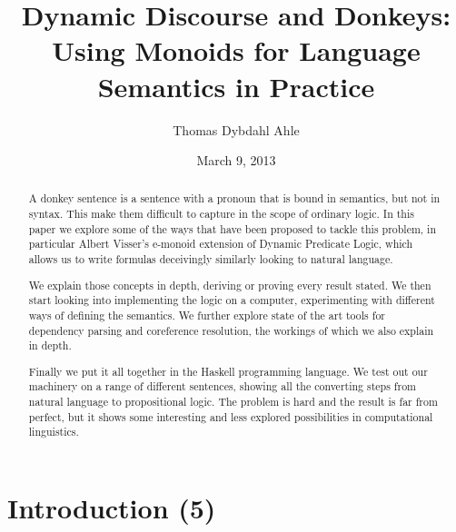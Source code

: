 \documentclass[12pt]{article}
\title{Dynamic Discourse and Donkeys: Using Monoids for Language Semantics in Practice}
\author{Thomas Dybdahl Ahle}
\date{March 9, 2013}
\let\stdsection\section
\renewcommand\section{\newpage\stdsection}
\begin{document}
\maketitle

\begin{abstract}


A donkey sentence is a sentence with a pronoun that is bound in semantics, but not in syntax. This make them difficult to capture in the scope of ordinary logic. In this paper we explore some of the ways that have been proposed to tackle this problem, in particular Albert Visser's e-monoid extension of Dynamic Predicate Logic, which allows us to write formulas deceivingly similarly looking to natural language.

We explain those concepts in depth, deriving or proving every result stated. We then start looking into implementing the logic on a computer, experimenting with different ways of defining the semantics. We further explore state of the art tools for dependency parsing and coreference resolution, the workings of which we also explain in depth.

Finally we put it all together in the Haskell programming language. We test out our machinery on a range of different sentences, showing all the converting steps from natural language to propositional logic. The problem is hard and the result is far from perfect, but it shows some interesting and less explored possibilities in computational linguistics.

\end{abstract}

\tableofcontents


\section{Introduction (5)}
\end{document}
